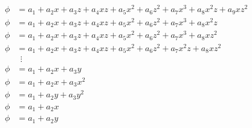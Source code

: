 \documentclass{article}
\begin{document}
\begin{align*}
	\phi &= a_1 + a_2 x + a_3 z + a_4 x z + a_5 x^2 + a_6 z^2 + a_7 x^3 + a_8 x^2 z + a_9 x z^2 \\
	\phi &= a_1 + a_2 x + a_3 z + a_4 x z + a_5 x^2 + a_6 z^2 + a_7 x^3 + a_8 x^2 z \\
	\phi &= a_1 + a_2 x + a_3 z + a_4 x z + a_5 x^2 + a_6 z^2 + a_7 x^3 + a_8 x z^2 \\
	\phi &= a_1 + a_2 x + a_3 z + a_4 x z + a_5 x^2 + a_6 z^2 + a_7 x^2 z + a_8 x z^2 \\
	&\:\:\vdots \\
	\phi &= a_1 + a_2 x + a_3 y \\
	\phi &= a_1 + a_2 x + a_3 x^2 \\
	\phi &= a_1 + a_2 y + a_3 y^2 \\
	\phi &= a_1 + a_2 x \\
	\phi &= a_1 + a_2 y \\
\end{align*}

\newpage
\end{document}
